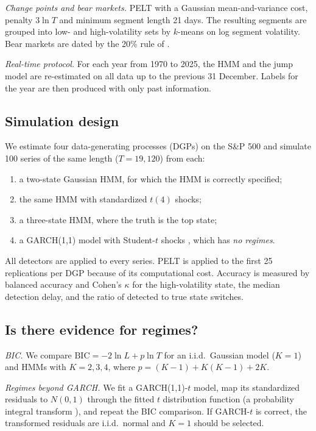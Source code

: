 \documentclass[conference]{IEEEtran}
\begin{document}
\emph{Change points and bear markets.} PELT \cite{killick2012} with a Gaussian mean-and-variance cost, penalty $3 \ln T$ and minimum segment length 21 days. The resulting segments are grouped into low- and high-volatility sets by $k$-means on log segment volatility. Bear markets are dated by the 20\% rule of \cite{lunde2004}.

\emph{Real-time protocol.} For each year from 1970 to 2025, the HMM and the jump model are re-estimated on all data up to the previous 31 December. Labels for the year are then produced with only past information.

\subsection{Simulation design}
We estimate four data-generating processes (DGPs) on the S\&P 500 and simulate 100 series of the same length ($T = 19{,}120$) from each:
\begin{enumerate}
\item a two-state Gaussian HMM, for which the HMM is correctly specified;
\item the same HMM with standardized $t(4)$ shocks;
\item a three-state HMM, where the truth is the top state;
\item a GARCH(1,1) model with Student-$t$ shocks \cite{bollerslev1986, bollerslev1987}, which has \emph{no regimes}.
\end{enumerate}
All detectors are applied to every series. PELT is applied to the first 25 replications per DGP because of its computational cost. Accuracy is measured by balanced accuracy and Cohen's $\kappa$ \cite{cohen1960} for the high-volatility state, the median detection delay, and the ratio of detected to true state switches.

\subsection{Is there evidence for regimes?}
\emph{BIC.} We compare $\mathrm{BIC} = -2 \ln L + p \ln T$ \cite{schwarz1978} for an i.i.d.\ Gaussian model ($K=1$) and HMMs with $K = 2, 3, 4$, where $p = (K-1) + K(K-1) + 2K$.

\emph{Regimes beyond GARCH.} We fit a GARCH(1,1)-$t$ model, map its standardized residuals to $N(0,1)$ through the fitted $t$ distribution function (a probability integral transform \cite{diebold1998}), and repeat the BIC comparison. If GARCH-$t$ is correct, the transformed residuals are i.i.d.\ normal and $K = 1$ should be selected.
\end{document}
